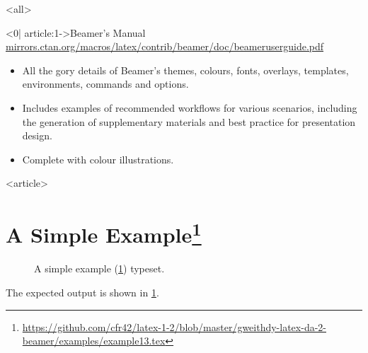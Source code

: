 

\mode
<all>

\mode*

\begin{frame}<0| article:1->{Beamer's Manual}
  \url{mirrors.ctan.org/macros/latex/contrib/beamer/doc/beameruserguide.pdf}
  \begin{itemize}
    \item All the gory details of Beamer's themes, colours, fonts, overlays, templates, environments, commands and options.
    \item Includes examples of recommended workflows for various scenarios, including the generation of supplementary materials and best practice for presentation design.
    \item Complete with colour illustrations.
  \end{itemize}
\end{frame}

\mode
<article>

\vfill
\appendix

\section<1-| beamer:0>[A Simple Example]{A Simple Example\texorpdfstring{\footnote{\url{https://github.com/cfr42/latex-1-2/blob/master/gweithdy-latex-da-2-beamer/examples/example13.tex}}}{}}\label{sec:simple}

\begin{figure}
  \centering
  \par
  \caption{A simple example (\cref{sec:simple}) typeset.}\label{fig:simple}
\end{figure}
The expected output is shown in \cref{fig:simple}.

